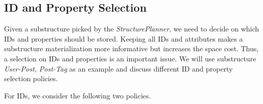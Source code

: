 \subsection{ID and Property Selection}

Given a substructure picked by the \emph{StructurePlanner}, we need to decide on which IDs and properties should be stored. Keeping all IDs and attributes makes a substructure materialization more informative but increases the space cost. %
Thus, a selection on IDs and properties is an important issue. We will use substructure \textit{User-Post, Post-Tag} as an example and discuss different ID and property selection policies.

For IDs, we consider the following two policies.

